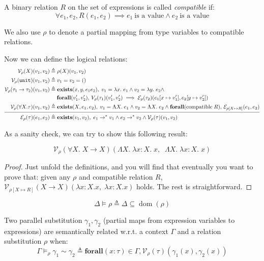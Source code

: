 \documentclass{notes}
\newcommand{\unit}{()}
\newcommand{\Unit}{\texttt{unit}}
\newcommand{\V}{\mathcal{V}}
\newcommand{\E}{\mathcal{E}}
\begin{document}
\begin{defn}
  A binary relation $R$ on the set of expressions is called \emph{compatible} if:
  $$\forall e_1, e_2, R(e_1, e_2) \implies e_1~\text{is a value} \land e_2~\text{is a value}$$
\end{defn}

We also use $\rho$ to denote a partial mapping from type variables to compatible relations.

Now we can define the logical relations:
\begin{align*}
  \V_\rho(X)(v_1,v_2) &\triangleq \rho(X)(v_1,v_2)\\
  \V_\rho(\Unit)(v_1,v_2) &\triangleq v_1=v_2=\unit\\
  \V_\rho(\tau_1\to\tau_2)(v_1,v_2) &\triangleq \textbf{exists}(x,y,e_1e_2),\;v_1=\lambda x.\;e_1\land v_2=\lambda y.\;e_2\land\\&\quad\;\textbf{forall}(v_1',v_2'),\,V_\rho(\tau_1)(v_1',v_2')\implies \E_\rho(\tau_2)(e_1[x\mapsto v_1'],e_2[y\mapsto v_2'])\\
  \V_\rho(\forall X.\tau)(v_1,v_2) &\triangleq \textbf{exists}(X,e_1,e_2),\;v_1=\Lambda X.\;e_1\land v_2=\Lambda X.\;e_2\land \textbf{forall}(\text{compatible}\;R),\,\E_{\rho[X\mapsto R]}(e_1,e_2)\\
  \noalign{\smallskip} \hline \noalign{\smallskip}
  \E_\rho(\tau)(e_1,e_2) &\triangleq \textbf{exists}(v_1,v_2),\;e_1\to^*v_1\land e_2\to^*v_2\land \V_\rho(\tau)(v_1,v_2)
\end{align*}

As a sanity check, we can try to show this following result:
\begin{prop}
  \[\V_\rho(\forall X.\;X\to X)(\Lambda X.\;\lambda x:X.\;x,\;\;\Lambda X.\;\lambda x:X.\;x)\]
\end{prop}

\begin{proof}
  Just unfold the definitions, and you will find that eventually you want to prove that: given any $\rho$ and compatible relation $R$, $\V_{\rho[X\mapsto R]}(X\to X)(\lambda x:X.x,\;\lambda x:X.x)$ holds. The rest is straightforward.
\end{proof}

\begin{defn}
  \[\Delta\vDash \rho \triangleq \Delta\subseteq \operatorname{dom}(\rho)\]
\end{defn}

\begin{defn}
  Two parallel substitution $\gamma_1,\gamma_2$ (partial maps from expression variables to expressions) are semantically related w.r.t. a context $\Gamma$ and a relation substitution $\rho$ when:
  \[\Gamma\vDash_\rho \gamma_1\sim \gamma_2 \triangleq \textbf{forall} (x:\tau)\in \Gamma, \V_\rho(\tau)(\gamma_1(x),\gamma_2(x))\]
\end{defn}
\end{document}
